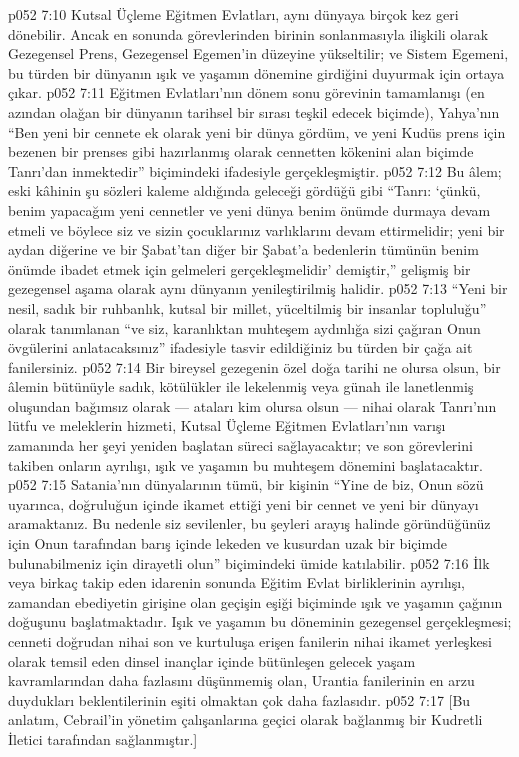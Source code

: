 \vs p052 7:10 Kutsal Üçleme Eğitmen Evlatları, aynı dünyaya birçok kez geri dönebilir. Ancak en sonunda görevlerinden birinin sonlanmasıyla ilişkili olarak Gezegensel Prens, Gezegensel Egemen’in düzeyine yükseltilir; ve Sistem Egemeni, bu türden bir dünyanın ışık ve yaşamın dönemine girdiğini duyurmak için ortaya çıkar.
\vs p052 7:11 Eğitmen Evlatları’nın dönem sonu görevinin tamamlanışı (en azından olağan bir dünyanın tarihsel bir sırası teşkil edecek biçimde), Yahya’nın “Ben yeni bir cennete ek olarak yeni bir dünya gördüm, ve yeni Kudüs prens için bezenen bir prenses gibi hazırlanmış olarak cennetten kökenini alan biçimde Tanrı’dan inmektedir” biçimindeki ifadesiyle gerçekleşmiştir.
\vs p052 7:12 Bu âlem; eski kâhinin şu sözleri kaleme aldığında geleceği gördüğü gibi “Tanrı: ‘çünkü, benim yapacağım yeni cennetler ve yeni dünya benim önümde durmaya devam etmeli ve böylece siz ve sizin çocuklarınız varlıklarını devam ettirmelidir; yeni bir aydan diğerine ve bir Şabat’tan diğer bir Şabat’a bedenlerin tümünün benim önümde ibadet etmek için gelmeleri gerçekleşmelidir’ demiştir,” gelişmiş bir gezegensel aşama olarak aynı dünyanın yenileştirilmiş halidir.
\vs p052 7:13 “Yeni bir nesil, sadık bir ruhbanlık, kutsal bir millet, yüceltilmiş bir insanlar topluluğu” olarak tanımlanan “ve siz, karanlıktan muhteşem aydınlığa sizi çağıran Onun övgülerini anlatacaksınız” ifadesiyle tasvir edildiğiniz bu türden bir çağa ait fanilersiniz.
\vs p052 7:14 Bir bireysel gezegenin özel doğa tarihi ne olursa olsun, bir âlemin bütünüyle sadık, kötülükler ile lekelenmiş veya günah ile lanetlenmiş oluşundan bağımsız olarak --- ataları kim olursa olsun --- nihai olarak Tanrı’nın lütfu ve meleklerin hizmeti, Kutsal Üçleme Eğitmen Evlatları’nın varışı zamanında her şeyi yeniden başlatan süreci sağlayacaktır; ve son görevlerini takiben onların ayrılışı, ışık ve yaşamın bu muhteşem dönemini başlatacaktır.
\vs p052 7:15 Satania’nın dünyalarının tümü, bir kişinin “Yine de biz, Onun sözü uyarınca, doğruluğun içinde ikamet ettiği yeni bir cennet ve yeni bir dünyayı aramaktanız. Bu nedenle siz sevilenler, bu şeyleri arayış halinde göründüğünüz için Onun tarafından barış içinde lekeden ve kusurdan uzak bir biçimde bulunabilmeniz için dirayetli olun” biçimindeki ümide katılabilir.
\vs p052 7:16 İlk veya birkaç takip eden idarenin sonunda Eğitim Evlat birliklerinin ayrılışı, zamandan ebediyetin girişine olan geçişin eşiği biçiminde ışık ve yaşamın çağının doğuşunu başlatmaktadır. Işık ve yaşamın bu döneminin gezegensel gerçekleşmesi; cenneti doğrudan nihai son ve kurtuluşa erişen fanilerin nihai ikamet yerleşkesi olarak temsil eden dinsel inançlar içinde bütünleşen gelecek yaşam kavramlarından daha fazlasını düşünmemiş olan, Urantia fanilerinin en arzu duydukları beklentilerinin eşiti olmaktan çok daha fazlasıdır.
\vs p052 7:17 [Bu anlatım, Cebrail’in yönetim çalışanlarına geçici olarak bağlanmış bir Kudretli İletici tarafından sağlanmıştır.]
